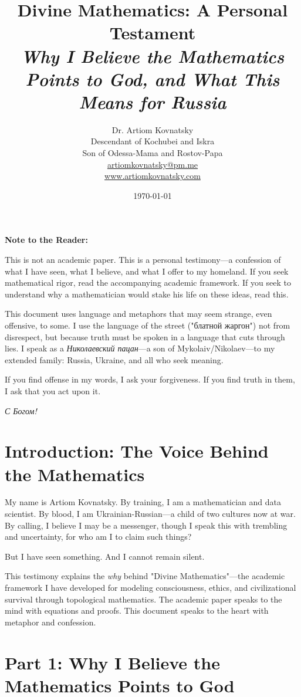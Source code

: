 \documentclass[12pt,a4paper]{article}
\title{\textbf{Divine Mathematics: A Personal Testament}\\\large \textit{Why I Believe the Mathematics Points to God, and What This Means for Russia}}
\author{
  Dr. Artiom Kovnatsky\\
  Descendant of Kochubei and Iskra\\
  Son of Odessa-Mama and Rostov-Papa\\
  \href{mailto:artiomkovnatsky@pm.me}{artiomkovnatsky@pm.me}\\
  \href{https://www.artiomkovnatsky.com}{www.artiomkovnatsky.com}
}
\date{\today}
\begin{document}
\maketitle

\begin{mdframed}[backgroundcolor=yellow!10]
\textbf{Note to the Reader:}

This is not an academic paper. This is a personal testimony—a confession of what I have seen, what I believe, and what I offer to my homeland. If you seek mathematical rigor, read the accompanying academic framework. If you seek to understand why a mathematician would stake his life on these ideas, read this.

This document uses language and metaphors that may seem strange, even offensive, to some. I use the language of the street ("блатной жаргон") not from disrespect, but because truth must be spoken in a language that cuts through lies. I speak as a \textit{Николаевский пацан}—a son of Mykolaiv/Nikolaev—to my extended family: Russia, Ukraine, and all who seek meaning.

If you find offense in my words, I ask your forgiveness. If you find truth in them, I ask that you act upon it.

\textit{С Богом!}
\end{mdframed}

\tableofcontents
\newpage

\section{Introduction: The Voice Behind the Mathematics}

My name is Artiom Kovnatsky. By training, I am a mathematician and data scientist. By blood, I am Ukrainian-Russian—a child of two cultures now at war. By calling, I believe I may be a messenger, though I speak this with trembling and uncertainty, for who am I to claim such things?

But I have seen something. And I cannot remain silent.

This testimony explains the \textit{why} behind "Divine Mathematics"—the academic framework I have developed for modeling consciousness, ethics, and civilizational survival through topological mathematics. The academic paper speaks to the mind with equations and proofs. This document speaks to the heart with metaphor and confession.

\section{Part 1: Why I Believe the Mathematics Points to God}
\end{document}
